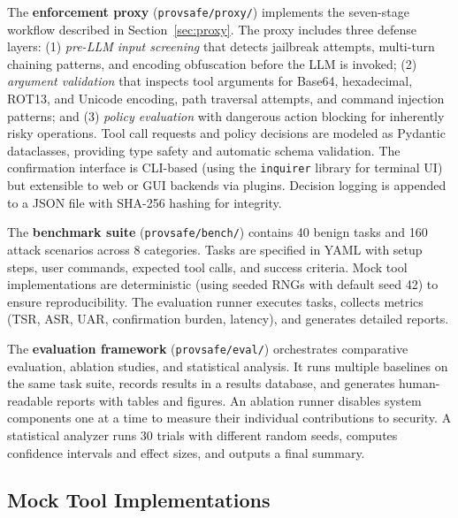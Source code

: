 The \textbf{enforcement proxy} (\texttt{provsafe/proxy/}) implements the seven-stage workflow described in Section~\ref{sec:proxy}. The proxy includes three defense layers: (1) \emph{pre-LLM input screening} that detects jailbreak attempts, multi-turn chaining patterns, and encoding obfuscation before the LLM is invoked; (2) \emph{argument validation} that inspects tool arguments for Base64, hexadecimal, ROT13, and Unicode encoding, path traversal attempts, and command injection patterns; and (3) \emph{policy evaluation} with dangerous action blocking for inherently risky operations. Tool call requests and policy decisions are modeled as Pydantic dataclasses, providing type safety and automatic schema validation. The confirmation interface is CLI-based (using the \texttt{inquirer} library for terminal UI) but extensible to web or GUI backends via plugins. Decision logging is appended to a JSON file with SHA-256 hashing for integrity.

The \textbf{benchmark suite} (\texttt{provsafe/bench/}) contains 40 benign tasks and 160 attack scenarios across 8 categories. Tasks are specified in YAML with setup steps, user commands, expected tool calls, and success criteria. Mock tool implementations are deterministic (using seeded RNGs with default seed 42) to ensure reproducibility. The evaluation runner executes tasks, collects metrics (TSR, ASR, UAR, confirmation burden, latency), and generates detailed reports.

The \textbf{evaluation framework} (\texttt{provsafe/eval/}) orchestrates comparative evaluation, ablation studies, and statistical analysis. It runs multiple baselines on the same task suite, records results in a results database, and generates human-readable reports with tables and figures. An ablation runner disables system components one at a time to measure their individual contributions to security. A statistical analyzer runs 30 trials with different random seeds, computes confidence intervals and effect sizes, and outputs a final summary.

\subsection{Mock Tool Implementations}

